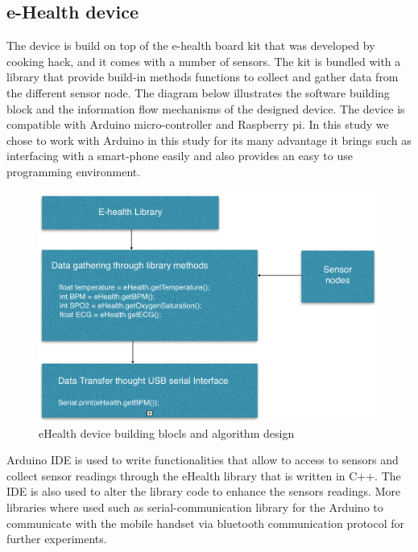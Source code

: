 \subsection{e-Health device}

The device is build on top of the e-health board kit that was developed by cooking hack, and it comes with a number of sensors. The kit is bundled with a library that provide build-in methods functions to collect and gather data from the different sensor node. The diagram below illustrates the software building block and the information flow mechanisms of the designed device. The device is compatible with Arduino micro-controller and Raspberry pi. In this study we chose to work with Arduino in this study for its many advantage it brings such as interfacing with a smart-phone easily and also provides an easy to use programming environment.


\begin{figure}[H]
\centering
\includegraphics[width=13cm]{images/ehealth_devices_design.png} %
\caption{eHealth device building blocls and algorithm design}
\label{fig:fig-eg}
\end{figure}


Arduino IDE is used to write functionalities that allow to access to sensors and collect sensor readings through the eHealth library that is written in C++. The IDE is also used to alter the library code to enhance the sensors readings. More libraries where used such as serial-communication library for the Arduino to communicate with the mobile handset via bluetooth communication protocol for further experiments.


